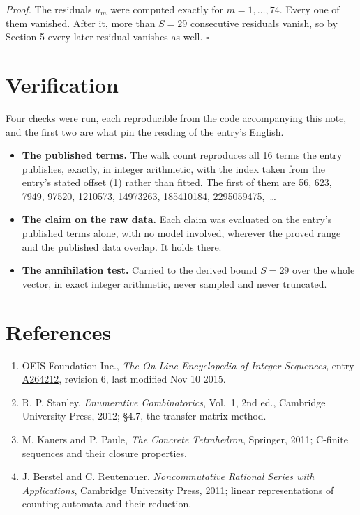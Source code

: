 \documentclass[11pt]{article}
\theoremstyle{definition}
\begin{document}
{\itshape Proof.} The residuals $u_m$ were computed exactly for $m = 1,\dots,74$. Every one of them vanished. After it, more than $S = 29$ consecutive residuals vanish, so by Section 5 every later residual vanishes as well. $\square$

\section{Verification}

Four checks were run, each reproducible from the code accompanying this note, and the first two are what pin the reading of the entry's English.

\begin{itemize}

\item {\bfseries The published terms.} The walk count reproduces all 16 terms the entry publishes, exactly, in integer arithmetic, with the index taken from the entry's stated offset (1) rather than fitted. The first of them are 56, 623, 7949, 97520, 1210573, 14973263, 185410184, 2295059475,~\dots

\item {\bfseries The claim on the raw data.} Each claim was evaluated on the entry's published terms alone, with no model involved, wherever the proved range and the published data overlap. It holds there.

\item {\bfseries The annihilation test.} Carried to the derived bound $S = 29$ over the whole vector, in exact integer arithmetic, never sampled and never truncated.

\end{itemize}

\section{References}

\begin{enumerate}

\item OEIS Foundation Inc., \emph{The On-Line Encyclopedia of Integer Sequences}, entry \href{https://oeis.org/A264212}{A264212}, revision 6, last modified Nov 10 2015.

\item R. P. Stanley, \emph{Enumerative Combinatorics}, Vol.~1, 2nd ed., Cambridge University Press, 2012; \S4.7, the transfer-matrix method.

\item M. Kauers and P. Paule, \emph{The Concrete Tetrahedron}, Springer, 2011; C-finite sequences and their closure properties.

\item J. Berstel and C. Reutenauer, \emph{Noncommutative Rational Series with Applications}, Cambridge University Press, 2011; linear representations of counting automata and their reduction.

\end{enumerate}
\end{document}
